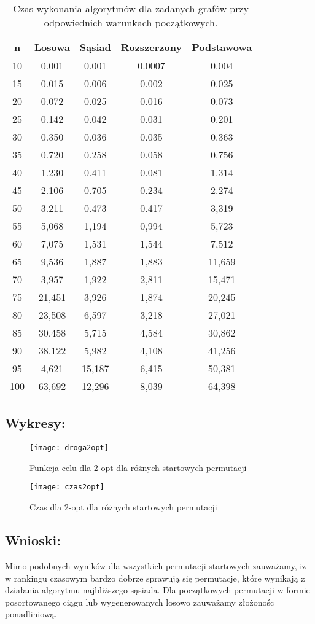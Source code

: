     \begin{table}[H]
    \begin{tabular}{|c | c | c | c | c |} 
     \hline
     n & Losowa & Sąsiad & Rozszerzony & Podstawowa \\ [0.5ex] 
     \hline\hline
      10 & 0.001 & 0.001 & 0.0007 & 0.004 \\
      15 & 0.015 & 0.006 & 0.002 & 0.025 \\
      20 & 0.072 & 0.025 & 0.016 & 0.073 \\
      25 & 0.142 & 0.042 & 0.031 & 0.201 \\
      30 & 0.350 & 0.036 & 0.035 & 0.363 \\
      35 & 0.720 & 0.258 & 0.058 & 0.756 \\
      40 & 1.230 & 0.411 & 0.081 & 1.314 \\
      45 & 2.106 & 0.705 & 0.234 & 2.274 \\
      50 & 3.211 & 0.473 & 0.417 & 3,319 \\
      55 & 5,068 & 1,194 & 0,994 & 5,723 \\
      60 & 7,075 & 1,531 & 1,544 & 7,512 \\
      65 & 9,536 & 1,887 & 1,883 & 11,659 \\ 
      70 & 3,957 &  1,922 & 2,811 & 15,471 \\
      75 & 21,451 &  3,926 & 1,874 & 20,245 \\
      80 & 23,508 &  6,597 & 3,218 & 27,021 \\
      85 & 30,458 &  5,715 & 4,584 & 30,862 \\
      90 & 38,122 &  5,982 & 4,108 & 41,256 \\
      95 & 4,621 &  15,187 &  6,415 & 50,381 \\
      100 & 63,692 &  12,296 &  8,039 & 64,398 \\

     \hline
    \end{tabular}
    \caption{Czas wykonania algorytmów dla zadanych grafów przy odpowiednich warunkach początkowych.}
    \end{table}

  \subsection{Wykresy: }
  \begin{figure}[H]
      \texttt{[image: droga2opt]}
      \centering
      \caption{Funkcja celu dla 2-opt dla różnych startowych permutacji}
    \end{figure}
    \begin{figure}[H]
      \texttt{[image: czas2opt]}
      \centering
      \caption{Czas dla 2-opt dla różnych startowych permutacji}
    \end{figure}
  \subsection{Wnioski: }
  Mimo podobnych wyników dla wszystkich permutacji startowych zauważamy, iz w rankingu czasowym bardzo dobrze sprawują się permutacje, które wynikają z działania algorytmu najbliższego sąsiada. Dla początkowych permutacji w formie posortowanego ciągu lub wygenerowanych losowo zauważamy złożonośc ponadliniową.

